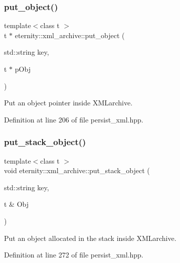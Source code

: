 \mbox{\label{classeternity_1_1xml__archive_af471f4a154095b98cf33dacd984281df}} 
\subsubsection{\texorpdfstring{put\+\_\+object()}{put\_object()}}
{\footnotesize\ttfamily template$<$class t $>$ \\
t $\ast$ eternity\+::xml\+\_\+archive\+::put\+\_\+object (\begin{DoxyParamCaption}\item[{std\+::string}]{key,  }\item[{t $\ast$}]{p\+Obj }\end{DoxyParamCaption})}



Put an object pointer inside X\+M\+Larchive. 



Definition at line 206 of file persist\+\_\+xml.\+hpp.

\mbox{\label{classeternity_1_1xml__archive_aac3817831029d6b510aead5978aac61e}} 
\subsubsection{\texorpdfstring{put\+\_\+stack\+\_\+object()}{put\_stack\_object()}}
{\footnotesize\ttfamily template$<$class t $>$ \\
void eternity\+::xml\+\_\+archive\+::put\+\_\+stack\+\_\+object (\begin{DoxyParamCaption}\item[{std\+::string}]{key,  }\item[{t \&}]{Obj }\end{DoxyParamCaption})}



Put an object allocated in the stack inside X\+M\+Larchive. 



Definition at line 272 of file persist\+\_\+xml.\+hpp.


